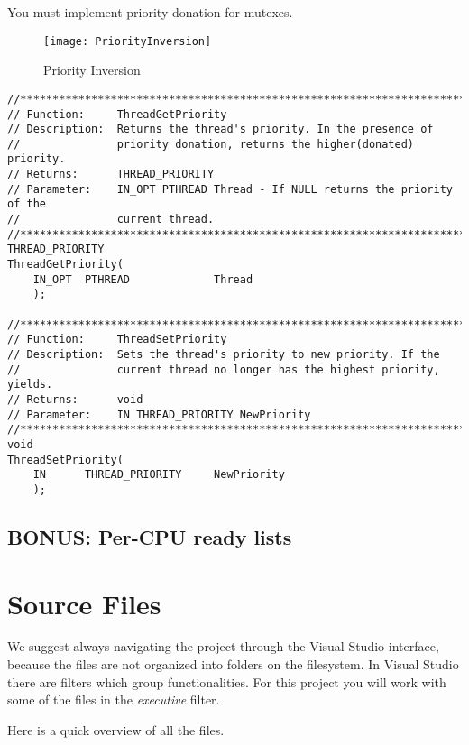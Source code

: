 You must implement priority donation for mutexes.

\begin{figure}
	\centering
	\texttt{[image: PriorityInversion]}
		\caption{Priority Inversion}
	\label{fig:PriorityInversion}
\end{figure}


\begin{lstlisting}[caption={Thread priority functions},label={lst:PrioFunc}]
//******************************************************************************
// Function:     ThreadGetPriority
// Description:  Returns the thread's priority. In the presence of
//               priority donation, returns the higher(donated) priority.
// Returns:      THREAD_PRIORITY
// Parameter:    IN_OPT PTHREAD Thread - If NULL returns the priority of the
//               current thread.
//******************************************************************************
THREAD_PRIORITY
ThreadGetPriority(
    IN_OPT  PTHREAD             Thread
    );

//******************************************************************************
// Function:     ThreadSetPriority
// Description:  Sets the thread's priority to new priority. If the
//               current thread no longer has the highest priority, yields.
// Returns:      void
// Parameter:    IN THREAD_PRIORITY NewPriority
//******************************************************************************
void
ThreadSetPriority(
    IN      THREAD_PRIORITY     NewPriority
    );
\end{lstlisting}

\subsection{BONUS: Per-CPU ready lists}

\section{Source Files}

We suggest always navigating the project through the Visual Studio interface, because the files are
not organized into folders on the filesystem. In Visual Studio there are filters which group
functionalities. For this project you will work with some of the files in the \textit{executive}
filter.

Here is a quick overview of all the files.



